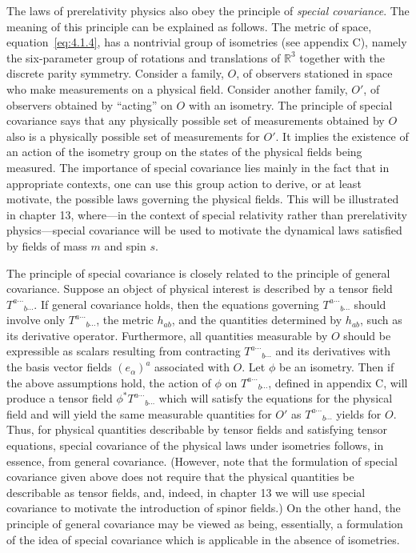 The laws of prerelativity physics also obey the principle of \emph{special
covariance}. The meaning of this principle can be explained as follows. The
metric of space, equation~\eqref{eq:4.1.4}, has a nontrivial group of isometries
(see appendix C), namely the six-parameter group of rotations and translations of
\(\mathbb R^3\) together with the discrete parity symmetry. Consider a family,
\(O\), of observers stationed in space who make measurements on a physical
field. Consider another family, \(O'\), of observers obtained by
\textquotedblleft acting\textquotedblright{} on \(O\) with an isometry. The
principle of special covariance says that any physically possible set of
measurements obtained by \(O\) also is a physically possible set of measurements
for \(O'\). It implies the existence of an action of the isometry group on the
states of the physical fields being measured. The importance of special covariance
lies mainly in the fact that in appropriate contexts, one can use this group action
to derive, or at least motivate, the possible laws governing the physical fields.
This will be illustrated in chapter 13, where---in the context of special relativity
rather than prerelativity physics---special covariance will be used to motivate the
dynamical laws satisfied by fields of mass \(m\) and spin \(s\).

The principle of special covariance is closely related to the principle of general
covariance. Suppose an object of physical interest is described by a tensor field
\(T^{a\cdots}{}_{b\cdots}\). If general covariance holds, then the equations
governing \(T^{a\cdots}{}_{b\cdots}\) should involve only
\(T^{a\cdots}{}_{b\cdots}\), the metric \(h_{ab}\), and the quantities
determined by \(h_{ab}\), such as its derivative operator. Furthermore, all
quantities measurable by \(O\) should be expressible as scalars resulting from
contracting \(T^{a\cdots}{}_{b\cdots}\) and its derivatives with the basis
vector fields \((e_\alpha)^a\) associated with \(O\). Let \(\phi\) be an
isometry. Then if the above assumptions hold, the action of \(\phi\) on
\(T^{a\cdots}{}_{b\cdots}\), defined in appendix C, will produce a tensor field
\(\phi^*T^{a\cdots}{}_{b\cdots}\) which will satisfy the equations for the
physical field and will yield the same measurable quantities for \(O'\) as
\(T^{a\cdots}{}_{b\cdots}\) yields for \(O\). Thus, for physical quantities
describable by tensor fields and satisfying tensor equations, special covariance of
the physical laws under isometries follows, in essence, from general covariance.
(However, note that the formulation of special covariance given above does not
require that the physical quantities be describable as tensor fields, and, indeed,
in chapter 13 we will use special covariance to motivate the introduction of spinor
fields.) On the other hand, the principle of general covariance may be viewed as
being, essentially, a formulation of the idea of special covariance which is
applicable in the absence of isometries.

